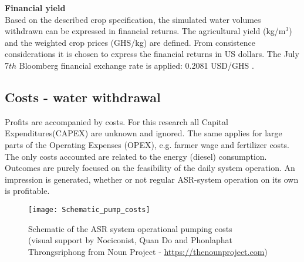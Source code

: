 %
%
%
%

\textbf{Financial yield} \\
Based on the described crop specification, the simulated water volumes withdrawn can be expressed in financial returns. The agricultural yield (kg/m$^3$) and the weighted crop prices (GHS/kg) are defined. From consistence considerations it is chosen to express the financial returns in US dollars. The July 7$th$ Bloomberg financial exchange rate is applied: 0.2081 USD/GHS \citep{Bloomberg2018}.

\subsection{Costs - water withdrawal}
Profits are accompanied by costs. For this research all Capital Expenditures(CAPEX) are unknown and ignored. The same applies for large parts of the Operating Expenses (OPEX), e.g. farmer wage and fertilizer costs. The only costs accounted are related to the energy (diesel) consumption. Outcomes are purely focused on the feasibility of the daily system operation. An impression is generated, whether or not regular ASR-system operation on its own is profitable. \\

\begin{figure}[h!]
 \centering
 \texttt{[image: Schematic\_pump\_costs]}
 \captionsetup{justification=centering} 
 \caption[Schematic of the ASR system operational pumping costs]{Schematic of the ASR system operational pumping costs \\ (visual support by Nociconist, Quan Do and Phonlaphat Throngsriphong from Noun Project - \url{https://thenounproject.com})}
 \label{fig:Schematic_pump_costs}
\end{figure}

